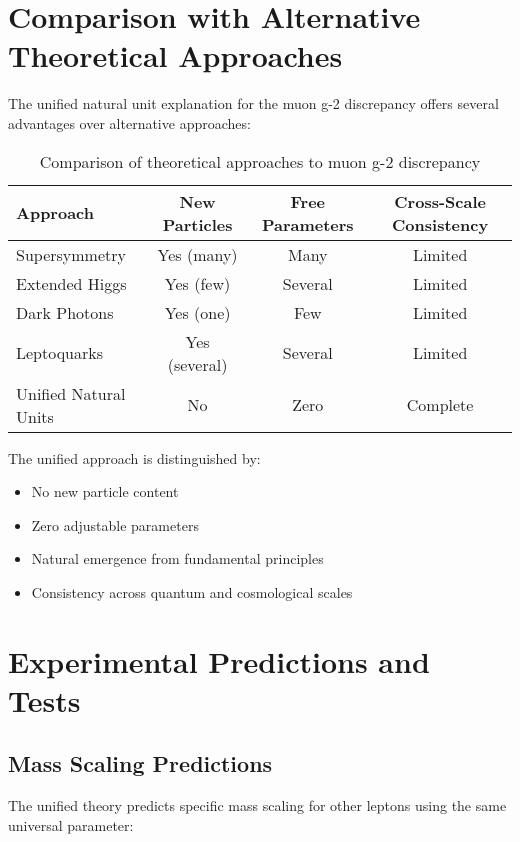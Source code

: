 \documentclass[12pt,a4paper]{article}
\begin{document}
	\section{Comparison with Alternative Theoretical Approaches}
	
	The unified natural unit explanation for the muon g-2 discrepancy offers several advantages over alternative approaches:
	
	\begin{table}[htbp]
		\centering
		\begin{tabular}{|l|c|c|c|}
			\hline
			\textbf{Approach} & \textbf{New Particles} & \textbf{Free Parameters} & \textbf{Cross-Scale Consistency} \\
			\hline
			Supersymmetry & Yes (many) & Many & Limited \\
			Extended Higgs & Yes (few) & Several & Limited \\
			Dark Photons & Yes (one) & Few & Limited \\
			Leptoquarks & Yes (several) & Several & Limited \\
			Unified Natural Units & No & Zero & Complete \\
			\hline
		\end{tabular}
		\caption{Comparison of theoretical approaches to muon g-2 discrepancy}
	\end{table}
	
	The unified approach is distinguished by:
	\begin{itemize}
		\item No new particle content
		\item Zero adjustable parameters
		\item Natural emergence from fundamental principles
		\item Consistency across quantum and cosmological scales
	\end{itemize}
	
	\section{Experimental Predictions and Tests}
	
	\subsection{Mass Scaling Predictions}
	\label{subsec:mass_scaling}
	
	The unified theory predicts specific mass scaling for other leptons using the same universal parameter:
	
\end{document}
